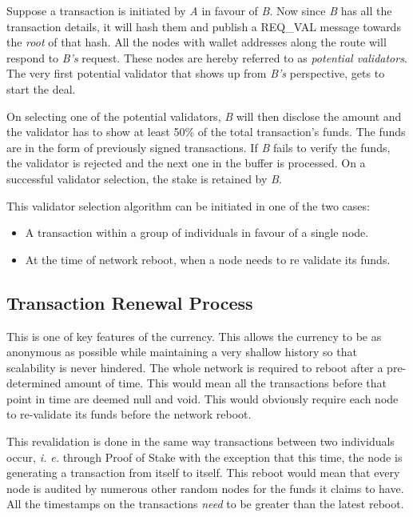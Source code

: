 \documentclass[conference,a4paper,12pt]{IEEEtran}
\begin{document}
	Suppose a transaction is initiated by \textit{A} in favour of \textit{B}. Now since \textit{B} has all the transaction details, it will hash them and publish a REQ\_VAL message towards the \textit{root} of that hash. All the nodes with wallet addresses along the route will respond to \textit{B's} request. These nodes are hereby referred to as \textit{potential validators}. The very first potential validator that shows up from \textit{B's} perspective, gets to start the deal.

	On selecting one of the potential validators, \textit{B} will then disclose the amount and the validator has to show at least 50\% of the total transaction's funds. The funds are in the form of previously signed transactions. If \textit{B} fails to verify the funds, the validator is rejected and the next one in the buffer is processed. On a successful validator selection, the stake is retained by \textit{B}.

	This validator selection algorithm can be initiated in one of the two cases:

	\begin{itemize}
    	\item A transaction within a group of individuals in favour of a single node.
	    \item At the time of network reboot, when a node needs to re validate its funds. 
	\end{itemize}


	\subsection{Transaction Renewal Process}
	
	This is one of key features of the currency. This allows the currency to be as anonymous as possible while maintaining a very shallow history so that scalability is never hindered. The whole network is required to reboot after a pre-determined amount of time. This would mean all the transactions before that point in time are deemed null and void. This would obviously require each node to re-validate its funds before the network reboot.

	This revalidation is done in the same way transactions between two individuals occur, \textit{i. e.} through Proof of Stake with the exception that this time, the node is generating a transaction from itself to itself. This reboot would mean that every node is audited by numerous other random nodes for the funds it claims to have. All the timestamps on the transactions \textit{need} to be greater than the latest reboot.
\end{document}
